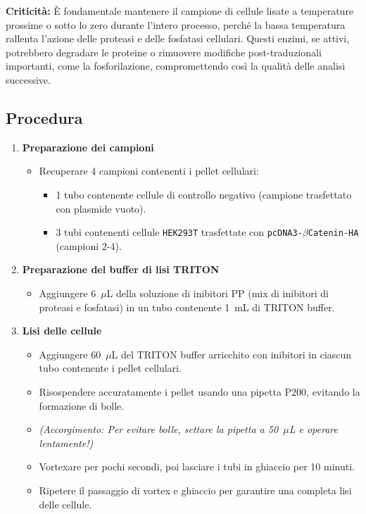 \begin{criticitaBox}
  \textbf{Criticità:} È fondamentale mantenere il campione di cellule lisate a temperature prossime o sotto lo zero durante l’intero processo, perché la bassa temperatura rallenta l’azione delle proteasi e delle fosfatasi cellulari.  
  Questi enzimi, se attivi, potrebbero degradare le proteine o rimuovere modifiche post-traduzionali importanti, come la fosforilazione, compromettendo così la qualità delle analisi successive.
\end{criticitaBox}
\vspace{1em}
\subsection{Procedura}


\begin{enumerate}\footnotesize
\item \textbf{Preparazione dei campioni}
\begin{itemize}
\item Recuperare 4 campioni contenenti i pellet cellulari:
\begin{itemize}
\item 1 tubo contenente cellule di controllo negativo (campione trasfettato con plasmide vuoto).
\item 3 tubi contenenti cellule \texttt{HEK293T} trasfettate con \texttt{pcDNA3-$\beta$Catenin-HA} (campioni 2-4).
\end{itemize}
\end{itemize}

\item \textbf{Preparazione del buffer di lisi TRITON}
\begin{itemize}
\item Aggiungere 6~$\mu$L della soluzione di inibitori PP (mix di inibitori di proteasi e fosfatasi) in un tubo contenente 1~mL di TRITON buffer.
\end{itemize}

\item \textbf{Lisi delle cellule}
\begin{itemize}
\item Aggiungere 60~$\mu$L del TRITON buffer arricchito con inibitori in ciascun tubo contenente i pellet cellulari.
\item Risospendere accuratamente i pellet usando una pipetta P200, evitando la formazione di bolle.
\item \textit{(Accorgimento: Per evitare bolle, settare la pipetta a 50~$\mu$L e operare lentamente!)}
\item Vortexare per pochi secondi, poi lasciare i tubi in ghiaccio per 10 minuti.
\item Ripetere il passaggio di vortex e ghiaccio per garantire una completa lisi delle cellule.
\end{itemize}


\end{enumerate}

